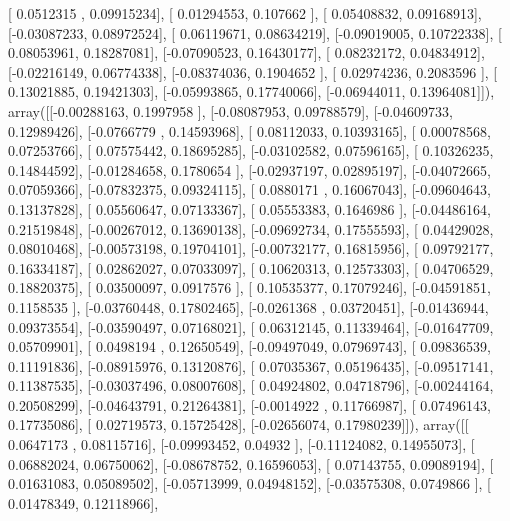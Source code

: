 \documentclass{article}
\begin{document}
       [ 0.0512315 ,  0.09915234],
       [ 0.01294553,  0.107662  ],
       [ 0.05408832,  0.09168913],
       [-0.03087233,  0.08972524],
       [ 0.06119671,  0.08634219],
       [-0.09019005,  0.10722338],
       [ 0.08053961,  0.18287081],
       [-0.07090523,  0.16430177],
       [ 0.08232172,  0.04834912],
       [-0.02216149,  0.06774338],
       [-0.08374036,  0.1904652 ],
       [ 0.02974236,  0.2083596 ],
       [ 0.13021885,  0.19421303],
       [-0.05993865,  0.17740066],
       [-0.06944011,  0.13964081]]), array([[-0.00288163,  0.1997958 ],
       [-0.08087953,  0.09788579],
       [-0.04609733,  0.12989426],
       [-0.0766779 ,  0.14593968],
       [ 0.08112033,  0.10393165],
       [ 0.00078568,  0.07253766],
       [ 0.07575442,  0.18695285],
       [-0.03102582,  0.07596165],
       [ 0.10326235,  0.14844592],
       [-0.01284658,  0.1780654 ],
       [-0.02937197,  0.02895197],
       [-0.04072665,  0.07059366],
       [-0.07832375,  0.09324115],
       [ 0.0880171 ,  0.16067043],
       [-0.09604643,  0.13137828],
       [ 0.05560647,  0.07133367],
       [ 0.05553383,  0.1646986 ],
       [-0.04486164,  0.21519848],
       [-0.00267012,  0.13690138],
       [-0.09692734,  0.17555593],
       [ 0.04429028,  0.08010468],
       [-0.00573198,  0.19704101],
       [-0.00732177,  0.16815956],
       [ 0.09792177,  0.16334187],
       [ 0.02862027,  0.07033097],
       [ 0.10620313,  0.12573303],
       [ 0.04706529,  0.18820375],
       [ 0.03500097,  0.0917576 ],
       [ 0.10535377,  0.17079246],
       [-0.04591851,  0.1158535 ],
       [-0.03760448,  0.17802465],
       [-0.0261368 ,  0.03720451],
       [-0.01436944,  0.09373554],
       [-0.03590497,  0.07168021],
       [ 0.06312145,  0.11339464],
       [-0.01647709,  0.05709901],
       [ 0.0498194 ,  0.12650549],
       [-0.09497049,  0.07969743],
       [ 0.09836539,  0.11191836],
       [-0.08915976,  0.13120876],
       [ 0.07035367,  0.05196435],
       [-0.09517141,  0.11387535],
       [-0.03037496,  0.08007608],
       [ 0.04924802,  0.04718796],
       [-0.00244164,  0.20508299],
       [-0.04643791,  0.21264381],
       [-0.0014922 ,  0.11766987],
       [ 0.07496143,  0.17735086],
       [ 0.02719573,  0.15725428],
       [-0.02656074,  0.17980239]]), array([[ 0.0647173 ,  0.08115716],
       [-0.09993452,  0.04932   ],
       [-0.11124082,  0.14955073],
       [ 0.06882024,  0.06750062],
       [-0.08678752,  0.16596053],
       [ 0.07143755,  0.09089194],
       [ 0.01631083,  0.05089502],
       [-0.05713999,  0.04948152],
       [-0.03575308,  0.0749866 ],
       [ 0.01478349,  0.12118966],
\end{document}
